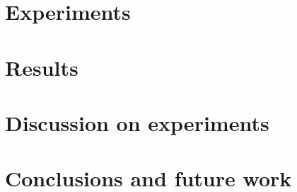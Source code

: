 \documentclass[12pt,a4paper,titlepage,twoside]{book}
\newcommand{\blankpage}{
\newpage \thispagestyle{empty}
\emph{  }
\newpage
}
\begin{document}
\chapter{Experiments} \label{experiments}
  
\chapter{Results} \label{ch:results}
	
\chapter{Discussion on experiments} \label{ch:discussion}
	 
\chapter{Conclusions and future work} \label{ch:concl}
  





\end{document}
